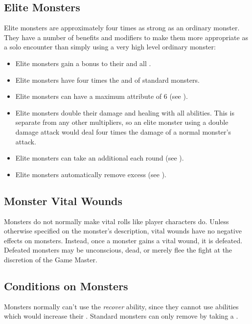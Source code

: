     \subsection{Elite Monsters}\label{Elite Monsters}
        Elite monsters are approximately four times as strong as an ordinary monster.
        They have a number of benefits and modifiers to make them more appropriate as a solo encounter than simply using a very high level ordinary monster:
        \begin{itemize}
            \item Elite monsters gain a  bonus to their  and all .
            \item Elite monsters have four times the  and  of standard monsters.
            \item Elite monsters can have a maximum attribute of 6 (see ).
            \item Elite monsters double their damage and healing with all abilities. This is separate from any other multipliers, so an elite monster using a double damage attack would deal four times the damage of a normal monster's attack.
            \item Elite monsters can take an additional  each round (see ).
            \item Elite monsters automatically remove excess  (see ).
        \end{itemize}

        \subsection{Monster Vital Wounds}
            Monsters do not normally make vital rolls like player characters do.
            Unless otherwise specified on the monster's description, vital wounds have no negative effects on monsters.
            Instead, once a monster gains a vital wound, it is defeated.
            Defeated monsters may be unconscious, dead, or merely flee the fight at the discretion of the Game Master.

        \subsection{Conditions on Monsters}\label{Conditions on Monsters}
            Monsters normally can't use the \textit{recover} ability, since they cannot use abilities which would increase their .
            Standard monsters can only remove  by taking a .

